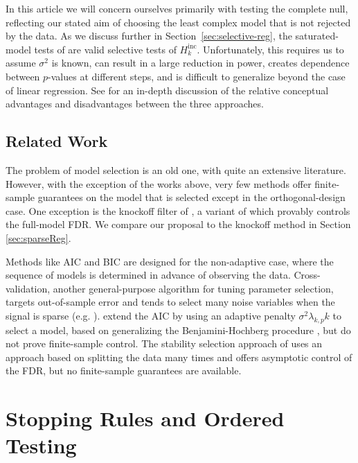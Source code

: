 \documentclass{article}
\begin{document}
In this article we will concern ourselves primarily with testing the complete null, reflecting our stated aim of choosing the least complex model that is not rejected by the data. As we discuss further in Section~\ref{sec:selective-reg}, the saturated-model tests of \citet{taylor2014exact} are valid selective tests of $H_k^{\text{inc}}$. Unfortunately, this requires us to assume $\sigma^2$ is known, can result in a large reduction in power, creates dependence between $p$-values at different steps, and is difficult to generalize beyond the case of linear regression. See \citet{gsell2013false} for an in-depth discussion of the relative conceptual advantages and disadvantages between the three approaches.


\subsection{Related Work}

The problem of model selection is an old one, with quite an extensive literature. However, with the exception of the works above, very few methods offer finite-sample guarantees on the model that is selected except in the orthogonal-design case. One  exception is the knockoff filter of \citet{barber2014controlling}, a variant of which provably controls the full-model FDR.
We compare our proposal to the knockoff method in Section \ref{sec:sparseReg}.

Methods like AIC \citet{akaike1974new} and BIC \citep{schwarz1978estimating} are designed for the non-adaptive case, where the sequence of models is determined in advance of observing the data. Cross-validation, another general-purpose algorithm for tuning parameter selection, targets out-of-sample error and tends to select many noise variables when the signal is sparse (e.g. \cite{LY2015}).   \citet{benjamini2009simple} extend the AIC by using an adaptive penalty $\sigma^2\lambda_{k,p} k$ to select a model, based on generalizing the Benjamini-Hochberg procedure \citet{benjamini1995controlling}, but do not prove finite-sample control. The stability selection approach of \citet{meinshausen2010stability} uses an approach based on splitting the data many times and offers asymptotic control of the FDR, but no finite-sample guarantees are available.

\section{Stopping Rules and Ordered Testing}\label{sec:ordered}
\end{document}
